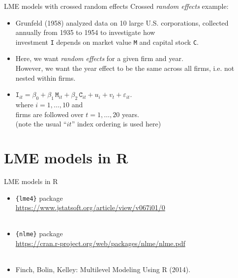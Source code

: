 \documentclass{beamer}
\begin{document}
\begin{frame}{LME models with crossed random effects}
Crossed \textit{random effects} example:\\
\medskip
\begin{itemize}
\item Grunfeld (1958) analyzed data on 10 large U.S. corporations,
collected annually from 1935 to 1954 to investigate how \\investment \texttt{I} depends on market value \texttt{M} and capital stock \texttt{C}.\\
\medskip
\item Here, we want \textit{random effects} for a given firm and year.\\
\smallskip
However, we want the year effect to be the same across all firms, i.e. not nested within firms.
\bigskip
\item $\texttt{I}_{it} = \beta_0 + \beta_1 \, \texttt{M}_{it} 
+ \beta_2 \, \texttt{C}_{it} + u_i + v_t + \varepsilon_{it}.$\\
\medskip
where $i=1, \dots, 10$ and \\firms are followed over $t=1,\dots,20$ years.
\\(note the usual ``$it$'' index ordering is used here)
\end{itemize}
\end{frame}
\section{LME models in R}
\begin{frame}{LME models in R}
\begin{itemize}
    \item \texttt{\{lme4\}} package \\ \smallskip
    \url{https://www.jstatsoft.org/article/view/v067i01/0}\\~\\
    \bigskip 
    \item \texttt{\{nlme\}} package \\ \smallskip
    \url{https://cran.r-project.org/web/packages/nlme/nlme.pdf}\\~\\
    \bigskip
    \item Finch, Bolin, Kelley: Multilevel Modeling Using R (2014).
\end{itemize}
\end{frame}
\end{document}
